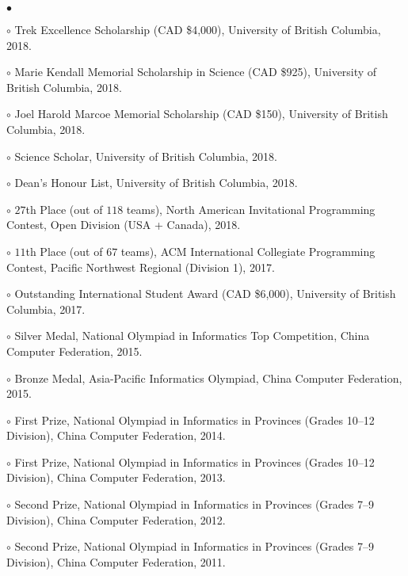 \documentclass[margin,line]{res}
\newenvironment{list2}{
  \begin{list}{$\bullet$}{%
      \setlength{\itemsep}{0in}
      \setlength{\parsep}{0in} \setlength{\parskip}{0in}
      \setlength{\topsep}{0in} \setlength{\partopsep}{0in}
      \setlength{\leftmargin}{0.2in}}}{\end{list}}
\begin{document}
\begin{resume}
\begin{list2}
\item[$\circ$] Trek Excellence Scholarship (CAD \$4,000), University of British Columbia, 2018.
\item[$\circ$] Marie Kendall Memorial Scholarship in Science (CAD \$925), University of British Columbia, 2018.
\item[$\circ$] Joel Harold Marcoe Memorial Scholarship (CAD \$150), University of British Columbia, 2018.
\item[$\circ$] Science Scholar, University of British Columbia, 2018.
\item[$\circ$] Dean's Honour List, University of British Columbia, 2018.
\item[$\circ$] $27$th Place (out of $118$ teams), North American Invitational Programming Contest, Open Division (USA + Canada), 2018.
\item[$\circ$] $11$th Place (out of $67$ teams), ACM International Collegiate Programming Contest, Pacific Northwest Regional (Division 1), 2017.
\item[$\circ$] Outstanding International Student Award (CAD \$6,000), University of British Columbia, 2017.
\item[$\circ$] Silver Medal, National Olympiad in Informatics Top Competition, China Computer Federation, 2015.
\item[$\circ$] Bronze Medal, Asia-Pacific Informatics Olympiad, China Computer Federation, 2015.
\item[$\circ$] First Prize, National Olympiad in Informatics in Provinces (Grades 10--12 Division), China Computer Federation, 2014.
\item[$\circ$] First Prize, National Olympiad in Informatics in Provinces (Grades 10--12 Division), China Computer Federation, 2013.
\item[$\circ$] Second Prize, National Olympiad in Informatics in Provinces (Grades 7--9 Division), China Computer Federation, 2012.
\item[$\circ$] Second Prize, National Olympiad in Informatics in Provinces (Grades 7--9 Division), China Computer Federation, 2011.
\end{list2}



\end{resume}
\end{document}
